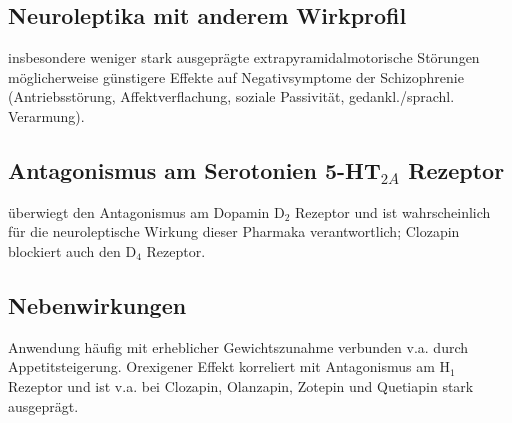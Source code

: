 \documentclass[10pt,a4paper]{report}
\begin{document}
\subsection{Neuroleptika mit anderem Wirkprofil} %
\label{sub:neuroleptika_mit_anderem_wirkprofil}
insbesondere weniger stark ausgeprägte extrapyramidalmotorische Störungen möglicherweise günstigere Effekte auf Negativsymptome der Schizophrenie (Antriebsstörung, Affektverflachung, soziale Passivität, gedankl./sprachl. Verarmung).
\subsection{Antagonismus am Serotonien 5-HT$_{2A}$ Rezeptor} %
\label{sub:antagonismus_am_serotonien_5_ht__}
überwiegt den Antagonismus am Dopamin D$_2$ Rezeptor und ist wahrscheinlich für die neuroleptische Wirkung dieser Pharmaka verantwortlich; Clozapin blockiert auch den D$_4$ Rezeptor.
\subsection{Nebenwirkungen} %
\label{sub:nebenwirkungen}
Anwendung häufig mit erheblicher Gewichtszunahme verbunden v.a. durch Appetitsteigerung. Orexigener Effekt korreliert mit Antagonismus am H$_1$ Rezeptor und ist v.a. bei Clozapin, Olanzapin, Zotepin und Quetiapin stark ausgeprägt.
\end{document}
